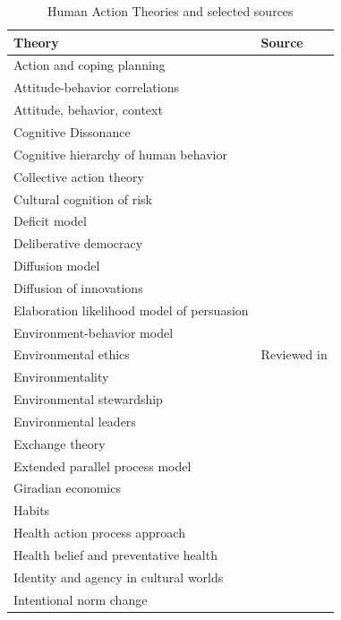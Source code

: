 \documentclass[12 pt]{article}
\begin{document}
\begin{longtable}{l|p{8cm}}
	\caption{Human Action Theories and selected sources} \label{tab:sources} \\
	\hline
	\textbf{Theory} & \textbf{Source} \\ 
	\hline
	Action and coping planning & \cite{Carraro2013} \\ 
	Attitude-behavior correlations & \cite{Kraus1995} \\ 
	Attitude, behavior, context  & \cite{Guagnano1995} \\ 
	Cognitive Dissonance  & \cite{Festinger1957,Festinger1959} \\ 
	Cognitive hierarchy of human behavior & \cite{Homer1988,Vaske1999} \\ 
	Collective action theory & \cite{Bimber2005} \\ 
	Cultural cognition of risk & \cite{Kahan2011,Kahan2012} \\ 
	Deficit model & \cite{Popkin1999,Sturgis2004} \\ 
	Deliberative democracy & \cite{Miller1992,John2009} \\ 
	Diffusion model & \cite{Oberschall1989} \\ 
	Diffusion of innovations & \cite{Rogers2010} \\ 
	Elaboration likelihood model of persuasion & \cite{Petty1986} \\ 
	Environment-behavior model & \cite{Hungerford1990} \\ 
	Environmental ethics & Reviewed in  \cite{Dickson2000} \\ 
	Environmentality & \cite{Agrawal2005} \\ 
	Environmental stewardship & \cite{Bennett2018} \\ 
	Environmental leaders  & \cite{Chawla2007} \\ 
	Exchange theory & \cite{Kotler2000} \\ 
	Extended parallel process model  & \cite{Maloney2011} \\ 
	Giradian economics  & \cite{Roe1996} \\ 
	Habits  & \cite{DeBruijn2007,Gardner2011} \\ 
	Health action process approach & \cite{Schwarzer2008} \\ 
	Health belief and preventative health & \cite{Rosenstock1974} \\ 
	Identity and agency in cultural worlds & \cite{Holland1998} \\ 
	Intentional norm change & \cite{Raymond2014} \\ 

\end{longtable}
\end{document}
